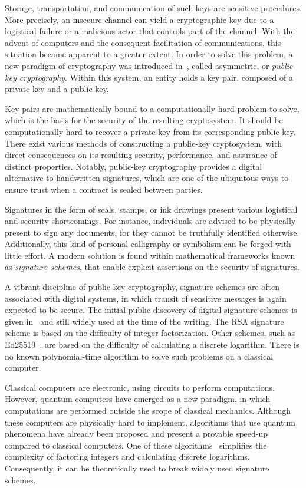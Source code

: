 \documentclass[english]{ufsc-thesis-rn46-2019/ufsc-thesis-rn46-2019}
\theoremstyle{definition}
\begin{document}
Storage, transportation, and communication of such keys are sensitive
procedures. More precisely, an insecure channel can yield a cryptographic key
due to a logistical failure or a malicious actor that controls part of the
channel. With the advent of computers and the consequent facilitation of
communications, this situation became apparent to a greater extent. In order to
solve this problem, a new paradigm of cryptography was introduced
in~\cite{Diffie:197611}, called asymmetric, or \emph{public-key
cryptography}. Within this system, an entity holds a key pair, composed of
a private key and a public key.

Key pairs are mathematically bound to a computationally hard problem to solve,
which is the basis for the security of the resulting cryptosystem. It should be
computationally hard to recover a private key from its corresponding public
key. There exist various methods of constructing a public-key cryptosystem,
with direct consequences on its resulting security, performance, and assurance
of distinct properties. Notably, public-key cryptography provides a digital
alternative to handwritten signatures, which are one of the ubiquitous ways to
ensure trust when a contract is sealed between parties.

Signatures in the form of seals, stamps, or ink drawings present various
logistical and security shortcomings. For instance, individuals are advised to
be physically present to sign any documents, for they cannot be truthfully
identified otherwise. Additionally, this kind of personal calligraphy or
symbolism can be forged with little effort. A modern solution is found within
mathematical frameworks known as \emph{signature schemes}, that enable explicit
assertions on the security of signatures.

A vibrant discipline of public-key cryptography, signature schemes are often
associated with digital systems, in which transit of sensitive messages is
again expected to be secure. The initial public discovery of digital signature
schemes is given in~\cite{Rivest:197802} and still widely used at the time of
the writing. The RSA signature scheme is based on the difficulty of integer
factorization. Other schemes, such as Ed25519~\cite{Bernstein:201208}, are
based on the difficulty of calculating a discrete logarithm. There is no known
polynomial-time algorithm to solve such problems on a classical computer.

Classical computers are electronic, using circuits to perform
computations. However, quantum computers have emerged as a new paradigm, in
which computations are performed outside the scope of classical
mechanics. Although these computers are physically hard to implement,
algorithms that use quantum phenomena have already been proposed and present
a provable speed-up compared to classical computers. One of these
algorithms~\cite{Shor:199710} simplifies the complexity of factoring integers
and calculating discrete logarithms. Consequently, it can be theoretically used
to break widely used signature schemes.
\end{document}
